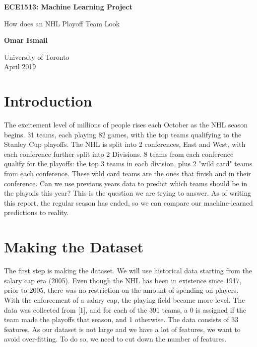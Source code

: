 \documentclass[10pt,letterpaper]{article}
\begin{document}
\begin{titlepage}
    \begin{center}
        \vspace*{10cm}
 
        \Huge
        \textbf{ECE1513: Machine Learning Project}
 
        \vspace{0.5cm}
        \LARGE
        How does an NHL Playoff Team Look
 
        \vspace{1.5cm}
 
        \textbf{Omar Ismail}
 
        \vfill
 

 
        \vspace{0.8cm}
 

        \Large
        University of Toronto\\
        April 2019
 
    \end{center}
\end{titlepage}


\section*{Introduction}
The excitement level of millions of people rises each October as the NHL season begins. 31 teams, each playing 82 games, with the top teams qualifying to the Stanley Cup playoffs. The NHL is split into 2 conferences, East and West, with each conference further split into 2 Divisions. 8 teams from each conference qualify for the playoffs: the top 3 teams in each division, plus 2  "wild card" teams from each conference. These wild card teams are the ones that finish  and  in their conference. Can we use previous years data to predict which teams should be in the playoffs this year? This is the question we are trying to answer. As of writing this report, the regular season has ended, so we can compare our machine-learned predictions to reality. 

\section*{Making the Dataset}
The first step is making the dataset. We will use historical data starting from the salary cap era (2005). Even though the NHL has been in existence since 1917, prior to 2005, there was no restriction on the amount of spending on players. With the enforcement of a salary cap, the playing field became more level.  The data was collected from [1], and for each of the 391 teams, a 0 is assigned if the team made the playoffs that season, and 1 otherwise. The data consists of 33 features. As our dataset is not large and we have a lot of features, we want to avoid over-fitting. To do so, we need to cut down the number of features.    
\end{document}
